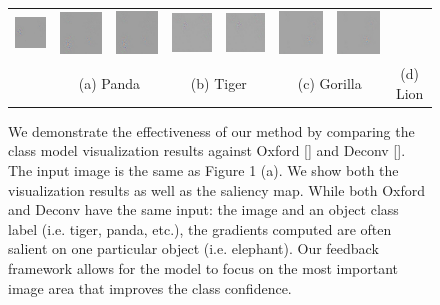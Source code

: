 \begin{figure}
\begin{center}
\begin{tabular}{ccccccccc}
\includegraphics[width=0.11\linewidth]{figs/visual_compare/saliency/feedback/panda} &
\includegraphics[width=0.11\linewidth]{figs/visual_compare/gradient/feedback/tiger} &
\includegraphics[width=0.11\linewidth]{figs/visual_compare/saliency/feedback/tiger} &
\includegraphics[width=0.11\linewidth]{figs/visual_compare/gradient/feedback/gorilla} &
\includegraphics[width=0.11\linewidth]{figs/visual_compare/saliency/feedback/gorilla} &
\includegraphics[width=0.11\linewidth]{figs/visual_compare/gradient/feedback/lion} &
\includegraphics[width=0.11\linewidth]{figs/visual_compare/saliency/feedback/lion} \\
&
\multicolumn{2}{c}{{\small (a) Panda}} &
\multicolumn{2}{c}{{\small (b) Tiger}} &
\multicolumn{2}{c}{{\small (c) Gorilla}} &
\multicolumn{2}{c}{{\small (d) Lion}} \\
\end{tabular}
\caption{We demonstrate the effectiveness of our method by comparing the class model visualization results against Oxford [] and Deconv []. The input image is the same as Figure 1 (a). We show both the visualization results as well as the saliency map. While both Oxford and Deconv have the same input: the image and an object class label (i.e. tiger, panda, etc.), the gradients computed are often salient on one particular object (i.e. elephant). Our feedback framework allows for the model to focus on the most important image area that improves the class confidence.}
\label{fig:visual_compare}
\end{center}
\end{figure}
